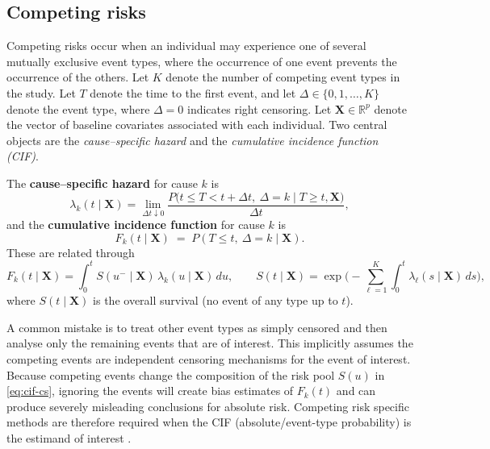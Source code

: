 \documentclass[a4paper,twoside,12pt]{report}
\begin{document}
\subsection{Competing risks}

Competing risks occur when an individual may experience one of several mutually exclusive event types, where the occurrence of one event prevents the occurrence of the others. Let \(K\) denote the number of competing event types in the study. Let \(T\) denote the time to the first event, and let \(\Delta \in \{0,1,\dots,K\}\) denote the event type, where \(\Delta = 0\) indicates right censoring. Let \(\boldsymbol{X} \in \mathbb{R}^p\) denote the vector of baseline covariates associated with each individual. Two central objects are the \emph{cause–specific hazard} and the \emph{cumulative incidence function (CIF)}.

The \textbf{cause–specific hazard} for cause \(k\) is
\[
\lambda_k(t\mid \boldsymbol{X})
=
\lim_{\Delta t\downarrow 0}
\frac{P\big(t\le T < t+\Delta t,\ \Delta=k \mid T\ge t, \boldsymbol{X}\big)}{\Delta t},
\]
and the \textbf{cumulative incidence function} for cause \(k\) is
\[
F_k(t\mid \boldsymbol{X}) \;=\; P(T\le t,\ \Delta=k \mid \boldsymbol{X}).
\]
These are related through
\begin{equation}\label{eq:cif-cs}
F_k(t\mid \boldsymbol{X})
=
\int_0^t S(u^-\mid \boldsymbol{X})\,\lambda_k(u\mid \boldsymbol{X})\,du,
\qquad
S(t\mid \boldsymbol{X})=\exp\!\Big(-\sum_{\ell=1}^K\int_0^t \lambda_\ell(s\mid \boldsymbol{X})\,ds\Big),
\end{equation}
where \(S(t\mid \boldsymbol{X})\) is the overall survival (no event of any type up to \(t\)).

A common mistake is to treat other event types as simply censored and then analyse only the remaining events that are of interest. This implicitly assumes the competing events are independent censoring mechanisms for the event of interest. Because competing events change the composition of the risk pool \(S(u)\) in \eqref{eq:cif-cs}, ignoring the events will create bias estimates of \(F_k(t)\) and can produce severely misleading conclusions for absolute risk. Competing risk specific methods are therefore required when the CIF (absolute/event-type probability) is the estimand of interest \citep{Cox1972,Breslow1974}.

\end{document}
